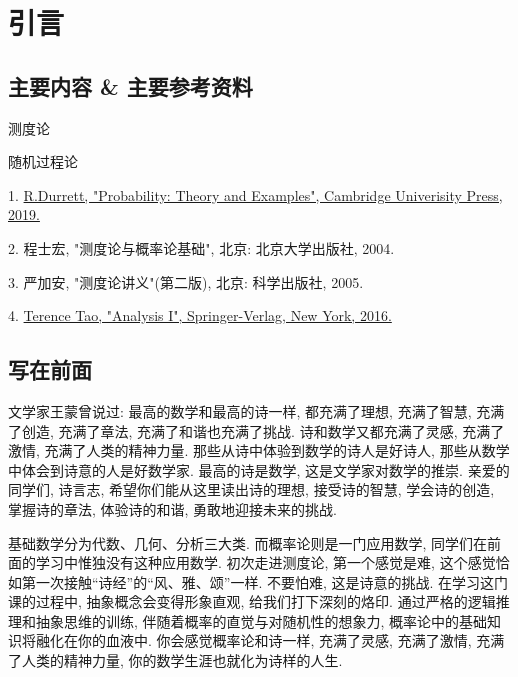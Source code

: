 \setcounter{chapter}{-1}
\chapter{引言}

%
\section{主要内容 \& 主要参考资料}
\begin{blist}
	\item 测度论
	\item 随机过程论
\end{blist}

\begin{blist}\addtolength{\itemsep}{-0.5ex}
	\item[1.] \href{https://services.math.duke.edu/~rtd/PTE/PTE5_011119.pdf}{R.Durrett, "Probability: Theory and Examples", Cambridge Univerisity Press, 2019.}
	\item[2.] 程士宏, "测度论与概率论基础", 北京: 北京大学出版社, 2004.
	\item[3.] 严加安, "测度论讲义"(第二版), 北京: 科学出版社, 2005.
	\item[4.] \href{https://www.springer.com/cn/book/9789811017896}{Terence Tao, "Analysis I", Springer-Verlag, New York, 2016.}
\end{blist}

\section{写在前面}
文学家王蒙曾说过: 最高的数学和最高的诗一样, 都充满了理想, 充满了智慧, 充满了创造, 充满了章法, 充满了和谐也充满了挑战. 诗和数学又都充满了灵感, 充满了激情, 充满了人类的精神力量. 那些从诗中体验到数学的诗人是好诗人, 那些从数学中体会到诗意的人是好数学家. 最高的诗是数学, 这是文学家对数学的推崇. 亲爱的同学们, 诗言志, 希望你们能从这里读出诗的理想, 接受诗的智慧, 学会诗的创造, 掌握诗的章法, 体验诗的和谐, 勇敢地迎接未来的挑战.

基础数学分为代数、几何、分析三大类. 而概率论则是一门应用数学, 同学们在前面的学习中惟独没有这种应用数学. 初次走进测度论, 第一个感觉是难, 这个感觉恰如第一次接触“诗经”的“风、雅、颂”一样. 不要怕难, 这是诗意的挑战. 在学习这门课的过程中, 抽象概念会变得形象直观, 给我们打下深刻的烙印. 通过严格的逻辑推理和抽象思维的训练, 伴随着概率的直觉与对随机性的想象力, 概率论中的基础知识将融化在你的血液中. 你会感觉概率论和诗一样, 充满了灵感, 充满了激情, 充满了人类的精神力量, 你的数学生涯也就化为诗样的人生.


